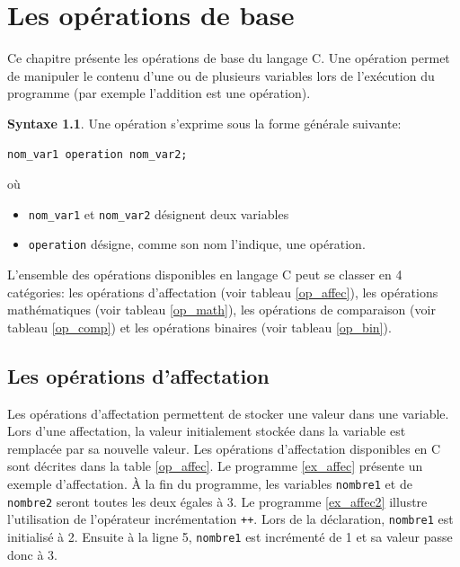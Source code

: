 \documentclass[a4paper,11pt]{book}
\theoremstyle{definition}
\newtheorem*{syntaxe}{Syntaxe}
\begin{document}
\chapter{Les opérations de base}
\label{chap_op} Ce chapitre présente les opérations de base du langage C. Une opération
permet de manipuler le contenu d'une ou de plusieurs variables lors de l'exécution du programme
(par exemple l'addition est une opération).
\begin{syntaxe}Une opération s'exprime sous la forme générale suivante:
\begin{lstlisting}
nom_var1 operation nom_var2;
\end{lstlisting}
où 
\begin{itemize}
\item \texttt{nom\_var1} et \texttt{nom\_var2} désignent deux variables
\item \texttt{operation} désigne, comme son nom l'indique, une opération.
\end{itemize}
\end{syntaxe}
L'ensemble des opérations disponibles en langage C peut se classer en 4
catégories: les opérations d'affectation (voir tableau  \ref{op_affec}), les opérations mathématiques (voir tableau  \ref{op_math}), les opérations de comparaison (voir tableau \ref{op_comp}) et les opérations binaires (voir tableau \ref{op_bin}).

\section{Les opérations d'affectation}
Les opérations d'affectation permettent de stocker une valeur dans une variable. Lors d'une affectation, la valeur
initialement stockée dans la variable est remplacée par sa nouvelle valeur. Les
opérations d'affectation disponibles en C sont décrites dans la table
\ref{op_affec}. Le programme \ref{ex_affec} présente un exemple
d'affectation. \`A la fin du programme, les variables
\texttt{nombre1} et de \texttt{nombre2} seront toutes les deux égales à 3. Le programme \ref{ex_affec2} illustre l'utilisation de l'opérateur incrémentation \texttt{++}. Lors de la déclaration, \texttt{nombre1} est initialisé à 2. Ensuite à la ligne 5, \texttt{nombre1} est incrémenté de 1 et sa valeur passe donc à $3$.




\end{document}
